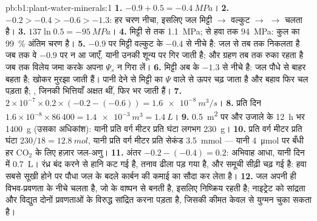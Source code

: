 \begin{solution}{pb:b1:plant-water-minerals:1}
\textbf{1.} $-0.9 + 0.5 = \qty{-0.4}{MPa}$।
\textbf{2.} $-0.2 > -0.4 > -0.6 > -1.3$: हर चरण नीचा, इसलिए जल
मिट्टी $\to$ वल्कुट $\to$  $\to$  चलता है।
\textbf{3.} $137\ln 0.5 = \qty{-95}{MPa}$।
\textbf{4.} मिट्टी से  तक \qty{1.1}{MPa};  से हवा तक \qty{94}{MPa}:
कुल का \qty{99}{\%} अंतिम चरण है।
\textbf{5.} $-0.9$ पर मिट्टी वल्कुट  के $-0.4$ से नीचे है: जल
 से तब तक निकलता है जब तक वे $-0.9$ पर न आ जाएँ, यानी उनकी
 शून्य पर गिर जाती है; और ग्रहण तब तक रुका रहता है जब तक 
विलेय जमा करके अपना $\Psi_s$ न गिरा लें।
\textbf{6.} मिट्टी अब  के $-1.3$ से नीचे है: जल पौधे से बाहर
बहता है;   खोकर मुरझा जाती हैं। पानी देने से
मिट्टी का $\Psi$  वाले से ऊपर चढ़ जाता है और बहाव फिर चल पड़ता है;
, जिनकी भित्तियाँ अक्षत थीं, फिर भर जाती हैं।
\textbf{7.} $2\times 10^{-7}\times 0.2\times(-0.2 - (-0.6)) =
\qty{1.6e-8}{m^3/s}$।
\textbf{8.} प्रति दिन $1.6\times 10^{-8}\times 86\,400 = \qty{1.4e-3}{m^3} =
\qty{1.4}{L}$।
\textbf{9.} \qty{0.5}{m^2} पर और उजाले के \qty{12}{h} भर \qty{1400}{g}
(उसका अधिकांश): यानी प्रति वर्ग मीटर प्रति घंटा लगभग \qty{230}{g}।
\textbf{10.} प्रति वर्ग मीटर प्रति घंटा $230/18 = \qty{12.8}{mol}$, यानी प्रति वर्ग मीटर प्रति सेकंड \qty{3.5}{mmol} --- यानी \qty{4}{\micro mol} पर बँधी हर $\mathrm{CO_2}$ के लिए हज़ार जल-अणु।
\textbf{11.} अंतर $-0.2 - (-0.4) = 0.2$: अभिवाह आधा, यानी दिन में
\qty{0.7}{L}। रंध्र बंद करने से हानि कट गई है, तनाव
ढीला पड़ गया है, और समूची सीढ़ी चढ़ गई है: हवा सबसे सूखी होने पर पौधा
जल के बदले कार्बन की कमाई का सौदा कर लेता है।
\textbf{12.} जल अपनी ही विभव-प्रवणता के नीचे चलता है, जो  के
वाष्पन से बनती है, इसलिए  निष्क्रिय रहती है; नाइट्रेट को सांद्रता और
विद्युत दोनों प्रवणताओं के विरुद्ध सांद्रित करना पड़ता है,
जिसकी कीमत केवल  से युग्मन चुका सकता है।

\end{solution}
